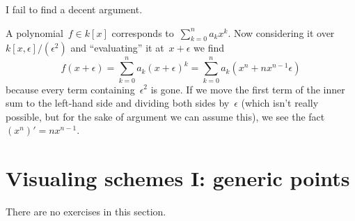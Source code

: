 \begin{exercise} %
  I fail to find a decent argument.
\end{exercise}

\begin{exercise}
  A polynomial~$f\in k[x]$ corresponds to~$\sum_{k=0}^na_kx^k$. Now considering it over~$k[x,\epsilon]/(\epsilon^2)$ and ``evaluating'' it at~$x+\epsilon$ we find
  \begin{equation}
    f(x+\epsilon)=\sum_{k=0}^na_k(x+\epsilon)^k=\sum_{k=0}^na_k\left( x^n+nx^{n-1}\epsilon \right)
  \end{equation}
  because every term containing~$\epsilon^2$ is gone. If we move the first term of the inner sum to the left-hand side and dividing both sides by~$\epsilon$ (which isn't really possible, but for the sake of argument we can assume this), we see the fact~$(x^n)'=nx^{n-1}$.
\end{exercise}


\section{Visualing schemes I: generic points}

There are no exercises in this section.
